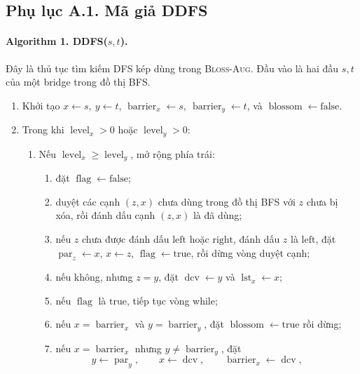 \documentclass[11pt]{article}
\begin{document}
\subsection*{Phụ lục A.1. Mã giả DDFS}

\paragraph{Algorithm 1. \textsc{DDFS}(\(s,t\)).}
Đây là thủ tục tìm kiếm DFS kép dùng trong \textsc{Bloss-Aug}. Đầu vào là hai
đầu \(s,t\) của một bridge trong đồ thị BFS.
\begin{enumerate}
  \item Khởi tạo \(x\leftarrow s,\ y\leftarrow t\),
  \(\operatorname{barrier}_x\leftarrow s,\ \operatorname{barrier}_y\leftarrow t\),
  và \(\operatorname{blossom}\leftarrow\mathrm{false}\).
  \item Trong khi \(\operatorname{level}_x>0\) hoặc \(\operatorname{level}_y>0\):
  \begin{enumerate}
    \item Nếu \(\operatorname{level}_x\ge \operatorname{level}_y\), mở rộng phía trái:
    \begin{enumerate}
      \item đặt \(\operatorname{flag}\leftarrow\mathrm{false}\);
      \item duyệt các cạnh \((z,x)\) chưa dùng trong đồ thị BFS với \(z\) chưa bị xóa,
      rồi đánh dấu cạnh \((z,x)\) là đã dùng;
      \item nếu \(z\) chưa được đánh dấu \(\mathrm{left}\) hoặc \(\mathrm{right}\),
      đánh dấu \(z\) là \(\mathrm{left}\), đặt
      \(\operatorname{par}_z\leftarrow x\), \(x\leftarrow z\),
      \(\operatorname{flag}\leftarrow\mathrm{true}\), rồi dừng vòng duyệt cạnh;
      \item nếu không, nhưng \(z=y\), đặt
      \(\operatorname{dcv}\leftarrow y\) và \(\operatorname{lst}_x\leftarrow x\);
      \item nếu \(\operatorname{flag}\) là \(\mathrm{true}\), tiếp tục vòng while;
      \item nếu \(x=\operatorname{barrier}_x\) và \(y=\operatorname{barrier}_y\),
      đặt \(\operatorname{blossom}\leftarrow\mathrm{true}\) rồi dừng;
      \item nếu \(x=\operatorname{barrier}_x\) nhưng \(y\ne\operatorname{barrier}_y\),
      đặt
      \[
        y\leftarrow \operatorname{par}_y,\qquad
        x\leftarrow \operatorname{dcv},\qquad
        \operatorname{barrier}_x\leftarrow \operatorname{dcv},\qquad
\]
\end{enumerate}
\end{enumerate}
\end{enumerate}
\end{document}
